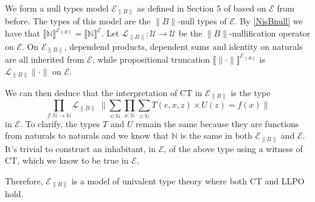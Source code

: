 \documentclass[12pt]{report}
\begin{document}
We form a null types model $\mathcal{E}_{\lVert B \rVert}$ as defined in Section 5 of \cite{1905.03014} based on $\mathcal{E}$ from before. 
The types of this model are the $\lVert B \rVert $-null types of $\mathcal{E}$. 
By \cref{NisBnull} we have that $\llbracket \mathbb{N} \rrbracket^{\mathcal{E}_{\lVert B \rVert}} = \llbracket \mathbb{N} \rrbracket^\mathcal{E}$. 
Let $\mathcal{L}_{\lVert B \rVert} : \mathcal{U} \rightarrow \mathcal{U}$ be the $\lVert B \rVert$-nullification operator on $\mathcal{E}$. 
On $\mathcal{E}_{\lVert B \rVert}$, dependend products, dependent sums and identity on naturals are all inherited from $\mathcal{E}$, while propositional truncation $\llbracket \lVert \cdot \rVert \rrbracket^{\mathcal{E}_{\lVert B \rVert}}$ is $\mathcal{L}_{\lVert B \rVert} \lVert\cdot \rVert $ on $\mathcal{E}$.

We can then deduce that the interpretation of CT in $\mathcal{E}_{\lVert B \rVert}$ is the type 
$$\prod_{f : \mathbb{N}\rightarrow \mathbb{N}} \mathcal{L}_{\lVert B \rVert}\;\Big\lVert \sum_{e : \mathbb{N}} \prod_{x : \mathbb{N}} \sum_{z : \mathbb{N}} T(e,x,z) \times U(z) = f(x) \Big\rVert$$
in $\mathcal{E}$. 
To clarify, the types $T$ and $U$ remain the same because they are functions from naturals to naturals and we know that $\mathbb{N}$ is the same in both $\mathcal{E}_{\lVert B \rVert}$ and $\mathcal{E}$. 
It's trivial to construct an inhabitant, in $\mathcal{E}$, of the above type using a witness of CT, which we know to be true in $\mathcal{E}$. 

Therefore, $\mathcal{E}_{\lVert B \rVert}$ is a model of univalent type theory where both CT and LLPO hold.
\end{document}

